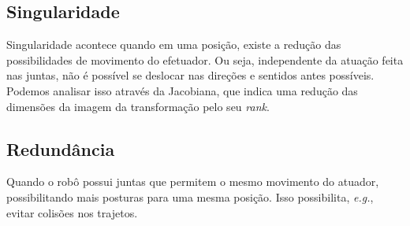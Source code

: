 \subsection*{Singularidade}

Singularidade acontece quando em uma posição, existe a redução das possibilidades de movimento do efetuador. Ou seja, independente da atuação feita nas juntas, não é possível se deslocar nas direções e sentidos antes possíveis. Podemos analisar isso através da Jacobiana, que indica uma redução das dimensões da imagem da transformação pelo seu \emph{rank}.

\subsection*{Redundância}

Quando o robô possui juntas que permitem o mesmo movimento do atuador, possibilitando mais posturas para uma mesma posição. Isso possibilita, \emph{e.g.}, evitar colisões nos trajetos.

